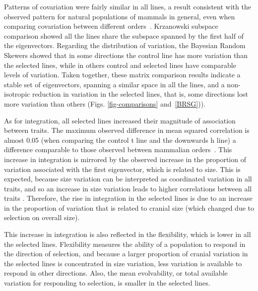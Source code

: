 \begin{refsection}
Patterns of covariation were fairly similar in all lines, a result
consistent with the observed pattern for natural populations of mammals
in general, even when comparing covariation between different
orders~\parencite{Porto2009-pi}. Krzanowski subspace comparison showed all the
lines share the subspace spanned by the first half of the eigenvectors.
Regarding the distribution of variation, the Bayesian Random Skewers
showed that in some directions the control line has more variation than
the selected lines, while in others control and selected lines have
comparable levels of variation. Taken together, these matrix comparison
results indicate a stable set of eigenvectors, spanning a similar space
in all the lines, and a non-isotropic reduction in variation in the
selected lines, that is, some directions lost more variation than others
(Figs. \ref{fig-comparisons} and~\ref{BRSG})).

As for integration, all selected lines increased their magnitude of
association between traits. The maximum observed difference in mean
squared correlation is almost 0.05 (when comparing the control t line
and the downwards h line) a difference comparable to those observed
between mammalian orders~\parencite{Marroig2009-gf}. This increase in
integration is mirrored by the observed increase in the proportion of
variation associated with the first eigenvector, which is related to
size. This is expected, because size variation can be interpreted as
coordinated variation in all traits, and so an increase in size
variation leads to higher correlations between all traits
\parencite{Porto2013-dc}. Therefore, the rise in integration in the selected
lines is due to an increase in the proportion of variation that is
related to cranial size (which changed due to selection on overall
size).

This increase in integration is also reflected in the flexibility, which
is lower in all the selected lines. Flexibility measures the ability of
a population to respond in the direction of selection, and because a
larger proportion of cranial variation in the selected lines is
concentrated in size variation, less variation is available to respond
in other directions. Also, the mean evolvability, or total available
variation for responding to selection, is smaller in the selected lines.


\end{refsection}

